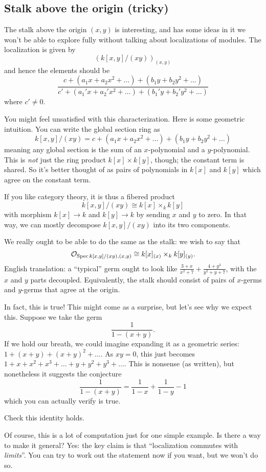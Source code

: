 \subsection{Stalk above the origin (tricky)}
The stalk above the origin $(x,y)$ is interesting,
and has some ideas in it we won't be able to explore fully
without talking about localizations of modules.
The localization is given by
\[ (k[x,y] / (xy))_{(x,y)} \]
and hence the elements should be
\[ \frac{c + (a_1 x + a_2 x^2 + \dots)
	+ (b_1 y + b_2 y^2 + \dots)}
	{c' + (a_1' x + a_2' x^2 + \dots)
	+ (b_1' y + b_2' y^2 + \dots)}
\]
where $c' \ne 0$.

You might feel unsatisfied with this characterization.
Here is some geometric intuition.
You can write the global section ring as
\[ k[x,y] / (xy) = c + (a_1 x + a_2 x^2 + \dots)
	+ (b_1 y + b_2 y^2 + \dots) \]
meaning any global section is the sum of an $x$-polynomial
and a $y$-polynomial.
This is \emph{not} just the ring product $k[x] \times k[y]$, though;
the constant term is shared.
So it's better thought of as pairs of polynomials in $k[x]$
and $k[y]$ which agree on the constant term.

If you like category theory, it is thus a fibered product
\[ k[x,y] / (xy) \cong k[x] \times_k k[y] \]
with morphism $k[x] \to k$ and $k[y] \to k$ by sending $x$ and $y$ to zero.
In that way, we can mostly decompose $k[x,y] / (xy)$
into its two components.

We really ought to be able to do the same as the stalk:
we wish to say that
\[ \mathcal O_{\operatorname{Spec} k[x,y] / (xy), (x,y)}
	\cong k[x]_{(x)} \times_k k[y]_{(y)}. \]
English translation: a ``typical'' germ
ought to look like $\frac{3+x}{x^2+7} + \frac{4+y^3}{y^2+y+7}$,
with the $x$ and $y$ parts decoupled.
Equivalently, the stalk should consist of
pairs of $x$-germs and $y$-germs that agree at the origin.

In fact, this is true!
This might come as a surprise, but let's see why we expect this.
Suppose we take the germ
\[ \frac{1}{1-(x+y)}. \]
If we hold our breath, we could imagine expanding it as
a geometric series: $1 + (x+y) + (x+y)^2 + \dots$.
As $xy =0 $, this just becomes $1+x+x^2+x^3 + \dots + y+y^2+y^3+\dots$.
This is nonsense (as written), but nonetheless it suggests the conjecture
\[ \frac{1}{1-(x+y)} = \frac{1}{1-x} + \frac{1}{1-y} - 1 \]
which you can actually verify is true.
\begin{ques}
	Check this identity holds.
\end{ques}

Of course, this is a lot of computation just for one simple example.
Is there a way to make it general?
Yes: the key claim is that ``localization commutes with \emph{limits}''.
You can try to work out the statement now if you want, but we won't do so.

